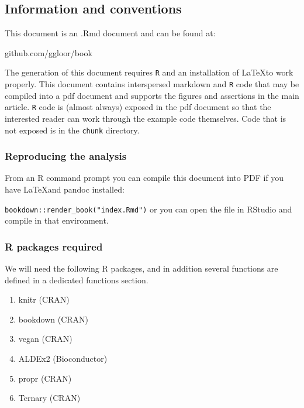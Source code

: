 \documentclass[onecolumn]{article}
\providecommand{\tightlist}{%
  \setlength{\itemsep}{0pt}\setlength{\parskip}{0pt}}
\begin{document}
\hypertarget{information-and-conventions}{%
\subsection*{Information and conventions}\label{information-and-conventions}}

This document is an .Rmd document and can be found at:

github.com/ggloor/book

The generation of this document requires \texttt{R} and an installation of \LaTeX to work properly. This document contains interspersed markdown and \texttt{R} code that may be compiled into a pdf document and supports the figures and assertions in the main article. \texttt{R} code is (almost always) exposed in the pdf document so that the interested reader can work through the example code themselves. Code that is not exposed is in the \texttt{chunk} directory.

\hypertarget{reproducing-the-analysis}{%
\subsubsection{Reproducing the analysis}\label{reproducing-the-analysis}}

From an R command prompt you can compile this document into PDF if you have \LaTeX and pandoc installed:

\texttt{bookdown::render\_book("index.Rmd")} or you can open the file in RStudio and compile in that environment.

\hypertarget{r-packages-required}{%
\subsubsection{R packages required}\label{r-packages-required}}

We will need the following R packages, and in addition several functions are defined in a dedicated functions section.

\begin{enumerate}
\def\labelenumi{\arabic{enumi}.}
\tightlist
\item
  knitr (CRAN)
\item
  bookdown (CRAN)
\item
  vegan (CRAN)
\item
  ALDEx2 (Bioconductor)
\item
  propr (CRAN)
\item
  Ternary (CRAN)
\end{enumerate}
\end{document}
